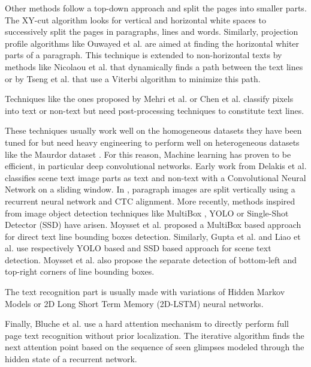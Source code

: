 \documentclass[conference]{IEEEtran}
\begin{document}
Other methods follow a top-down approach and split the pages into smaller parts. The XY-cut algorithm \cite{nagy1984hierarchical} looks for vertical and horizontal white spaces to successively split the pages in paragraphs, lines and words. Similarly, projection profile algorithms like Ouwayed et al. \cite{ouwayed2012general} are aimed at finding the horizontal whiter parts of a paragraph. This technique is extended to non-horizontal texts by methods like Nicolaou et al. \cite{Nicolaou2009} that dynamically finds a path between the text lines or by Tseng et al. \cite{tseng1999recognition} that use a Viterbi algorithm to minimize this path.

Techniques like the ones proposed by Mehri et al. \cite{mehri2013pixel} or Chen et al. \cite{chen2015page} classify pixels into text or non-text but need post-processing techniques to constitute text lines.

These techniques usually work well on the homogeneous datasets they have been tuned for but need heavy engineering to perform well on heterogeneous datasets like the Maurdor dataset \cite{Brunessaux2014}. For this reason, Machine learning has proven to be efficient, in particular deep convolutional networks. Early work from Delakis et al. \cite{delakis2008text} classifies scene text image parts as text and non-text with a Convolutional Neural Network on a sliding window. In \cite{moysset2015paragraph}, paragraph images are split vertically using a recurrent neural network and CTC alignment. More recently, methods inspired from image object detection techniques like MultiBox \cite{erhan2014scalable}, YOLO \cite{YOLOCVPR2016} or Single-Shot Detector (SSD) \cite{LiuErhanSSD2016} have arisen. Moysset et al. \cite{moysset2016learning} proposed a MultiBox based approach for direct text line bounding boxes detection. Similarly, Gupta et al. \cite{gupta2016synthetic} and Liao et al. \cite{liao2016textboxes} use respectively YOLO based and SSD based approach for scene text detection. Moysset et al. \cite{moysset2016points} also propose the separate detection of bottom-left and top-right corners of line bounding boxes.

The text recognition part is usually made with variations of Hidden Markov Models \cite{bertolami2008hidden} or 2D Long Short Term Memory (2D-LSTM) \cite{Graves2DLSTM2009} neural networks.

Finally, Bluche et al. \cite{BlucheNIPS2016} use a hard attention mechanism to directly perform full page text recognition without prior localization. The iterative algorithm finds the next attention point based on the sequence of seen glimpses modeled through the hidden state of a recurrent network.
\end{document}
